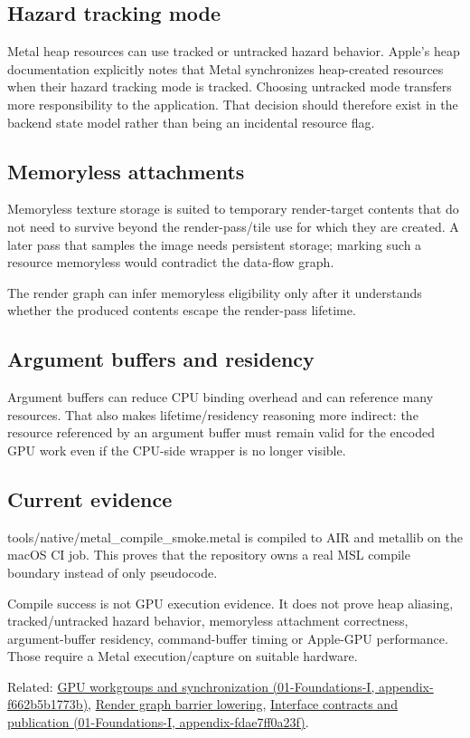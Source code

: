 \subsection{Hazard tracking mode}\label{appendix-563b2cb23fc3-hazard-tracking-mode}

Metal heap resources can use tracked or untracked hazard behavior. Apple's heap documentation explicitly notes that Metal synchronizes heap-created resources when their hazard tracking mode is tracked. Choosing untracked mode transfers more responsibility to the application. That decision should therefore exist in the backend state model rather than being an incidental resource flag.

\subsection{Memoryless attachments}\label{appendix-563b2cb23fc3-memoryless-attachments}

Memoryless texture storage is suited to temporary render-target contents that do not need to survive beyond the render-pass/tile use for which they are created. A later pass that samples the image needs persistent storage; marking such a resource memoryless would contradict the data-flow graph.

The render graph can infer memoryless eligibility only after it understands whether the produced contents escape the render-pass lifetime.

\subsection{Argument buffers and residency}\label{appendix-563b2cb23fc3-argument-buffers-and-residency}

Argument buffers can reduce CPU binding overhead and can reference many resources. That also makes lifetime/residency reasoning more indirect: the resource referenced by an argument buffer must remain valid for the encoded GPU work even if the CPU-side wrapper is no longer visible.

\subsection{Current evidence}\label{appendix-563b2cb23fc3-current-evidence}

tools/native/metal\_compile\_smoke.metal is compiled to AIR and metallib on the macOS CI job. This proves that the repository owns a real MSL compile boundary instead of only pseudocode.

Compile success is not GPU execution evidence. It does not prove heap aliasing, tracked/untracked hazard behavior, memoryless attachment correctness, argument-buffer residency, command-buffer timing or Apple-GPU performance. Those require a Metal execution/capture on suitable hardware.

Related: \href{../01-Foundations-I/main.pdf\#nameddest=appendix-f662b5b1773b}{GPU workgroups and synchronization (01-Foundations-I, appendix-f662b5b1773b)}, \hyperref[appendix-0fc95374cb7e]{Render graph barrier lowering}, \href{../01-Foundations-I/main.pdf\#nameddest=appendix-fdae7ff0a23f}{Interface contracts and publication (01-Foundations-I, appendix-fdae7ff0a23f)}.
